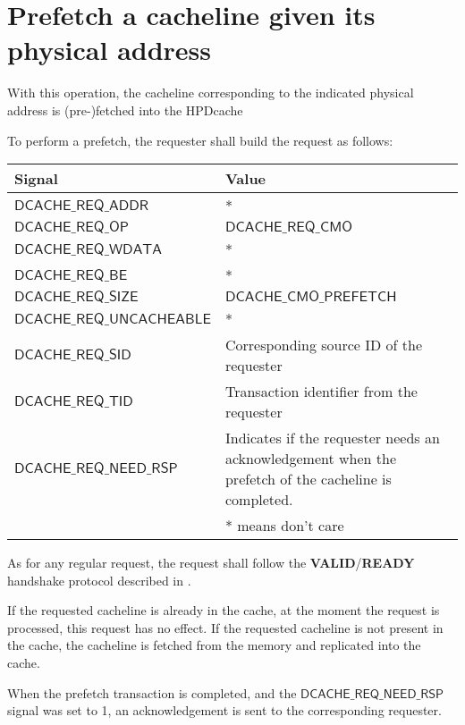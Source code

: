 \documentclass[10pt,titlepage,twoside]{book}
\begin{document}
\newpage
\section{Prefetch a cacheline given its physical address}

With this operation, the cacheline corresponding to the indicated physical address is (pre-)fetched into the \ac{HPDcache}

To perform a prefetch, the requester shall build the request as follows:

{\centering\footnotesize\begin{tabular}{p{.38\linewidth}p{.55\linewidth}}
  \toprule
  \textbf{Signal}
  & \textbf{Value} \\
  \midrule
  $\mathsf{DCACHE\_REQ\_ADDR}$
  & *\\
  \midrule
  $\mathsf{DCACHE\_REQ\_OP}$
  & $\mathsf{DCACHE\_REQ\_CMO}$ \\
  \midrule
  $\mathsf{DCACHE\_REQ\_WDATA}$
  & *\\
  \midrule
  $\mathsf{DCACHE\_REQ\_BE}$
  & *\\
  \midrule
  $\mathsf{DCACHE\_REQ\_SIZE}$
  & $\mathsf{DCACHE\_CMO\_PREFETCH}$\\
  \midrule
  $\mathsf{DCACHE\_REQ\_UNCACHEABLE}$
  & *\\
  \midrule
  $\mathsf{DCACHE\_REQ\_SID}$
  & Corresponding source ID of the requester\\
  \midrule
  $\mathsf{DCACHE\_REQ\_TID}$
  & Transaction identifier from the requester\\
  \midrule
  $\mathsf{DCACHE\_REQ\_NEED\_RSP}$
  & Indicates if the requester needs an acknowledgement when the prefetch of the cacheline is completed.\\
  \bottomrule
  & * means don't care \\
\end{tabular}}

As for any regular request, the request shall follow the \textbf{VALID}/\textbf{READY} handshake protocol described in .

If the requested cacheline is already in the cache, at the moment the request is processed, this request has no effect. If the requested cacheline is not present in the cache, the cacheline is fetched from the memory and replicated into the cache.

When the prefetch transaction is completed, and the $\mathsf{DCACHE\_REQ\_NEED\_RSP}$ signal was set to 1, an acknowledgement is sent to the corresponding requester.
\end{document}
